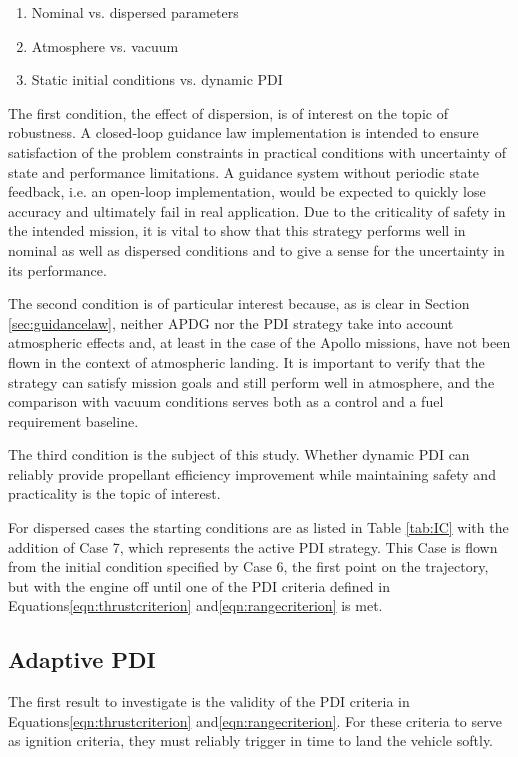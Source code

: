 \begin{enumerate}
	\item Nominal vs. dispersed parameters
	\item Atmosphere vs. vacuum
	\item Static initial conditions vs. dynamic PDI
\end{enumerate}

The first condition, the effect of dispersion, is of interest on the topic of robustness. A closed-loop guidance law implementation is intended to ensure satisfaction of the problem constraints in practical conditions with uncertainty of state and performance limitations. A guidance system without periodic state feedback, i.e. an open-loop implementation, would be expected to quickly lose accuracy and ultimately fail in real application. Due to the criticality of safety in the intended mission, it is vital to show that this strategy performs well in nominal as well as dispersed conditions and to give a sense for the uncertainty in its performance.

The second condition is of particular interest because, as is clear in Section \ref{sec:guidancelaw}, neither APDG nor the PDI strategy take into account atmospheric effects and, at least in the case of the Apollo missions, have not been flown in the context of atmospheric landing. It is important to verify that the strategy can satisfy mission goals and still perform well in atmosphere, and the comparison with vacuum conditions serves both as a control and a fuel requirement baseline. 

The third condition is the subject of this study. Whether dynamic PDI can reliably provide propellant efficiency improvement while maintaining safety and practicality is the topic of interest.

For dispersed cases the starting conditions are as listed in Table \ref{tab:IC} with the addition of Case 7, which represents the active PDI strategy. This Case is flown from the initial condition specified by Case 6, the first point on the trajectory, but with the engine off until one of the PDI criteria defined in Equations\:\ref{eqn:thrustcriterion} and\:\ref{eqn:rangecriterion} is met.

\subsection{Adaptive PDI}
The first result to investigate is the validity of the PDI criteria in Equations\:\ref{eqn:thrustcriterion} and\:\ref{eqn:rangecriterion}. For these criteria to serve as ignition criteria, they must reliably trigger in time to land the vehicle softly.

